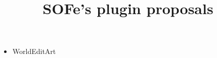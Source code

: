 \documentclass{article}
\title{SOFe's plugin proposals}
\begin{document}
	\maketitle
	\begin{itemize}
		\item WorldEditArt
	\end{itemize}
\end{document}
